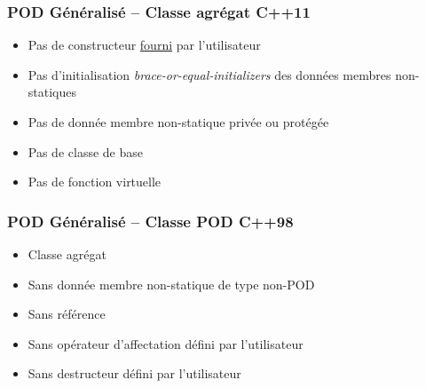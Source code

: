 \documentclass[C++.tex]{subfiles}
\begin{document}
\begin{frame}[fragile]
	\frametitle{POD Généralisé -- Classe agrégat C++11}
	\begin{itemize}
		\item Pas de constructeur \underline{fourni} par l'utilisateur


		\item Pas d'initialisation \textit{brace-or-equal-initializers} des données membres non-statiques
		\item Pas de donnée membre non-statique privée ou protégée
		\item Pas de classe de base
		\item Pas de fonction virtuelle
	\end{itemize}
\end{frame}

\begin{frame}[fragile]
	\frametitle{POD Généralisé -- Classe POD C++98}
	\begin{itemize}
		\item Classe agrégat
		\item Sans donnée membre non-statique de type non-POD
		\item Sans référence
		\item Sans opérateur d'affectation défini par l'utilisateur
		\item Sans destructeur défini par l'utilisateur
	\end{itemize}
\end{frame}
\end{document}
